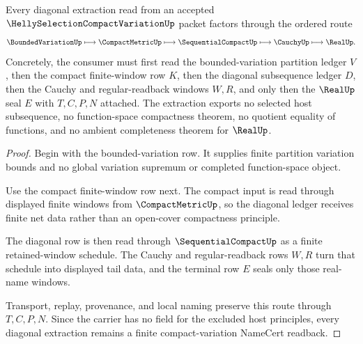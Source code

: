 \begin{theorem}
\label{thm:helly-selection-compact-variation-diagonal-extraction}
Every diagonal extraction read from an accepted $\HellySelectionCompactVariationUp$ packet factors through the ordered route
$$
\BoundedVariationUp \longmapsto \CompactMetricUp \longmapsto \SequentialCompactUp \longmapsto \CauchyUp \longmapsto \RealUp .
$$
Concretely, the consumer must first read the bounded-variation partition ledger $V$, then the compact finite-window row $K$, then the diagonal subsequence ledger $D$, then the Cauchy and regular-readback windows $W,R$, and only then the $\RealUp$ seal $E$ with $T,C,P,N$ attached. The extraction exports no selected host subsequence, no function-space compactness theorem, no quotient equality of functions, and no ambient completeness theorem for $\RealUp$.
\end{theorem}
\begin{proof}
Begin with the bounded-variation row. It supplies finite partition variation bounds and no global variation supremum or completed function-space object.

Use the compact finite-window row next. The compact input is read through displayed finite windows from $\CompactMetricUp$, so the diagonal ledger receives finite net data rather than an open-cover compactness principle.

The diagonal row is then read through $\SequentialCompactUp$ as a finite retained-window schedule. The Cauchy and regular-readback rows $W,R$ turn that schedule into displayed tail data, and the terminal row $E$ seals only those real-name windows.

Transport, replay, provenance, and local naming preserve this route through $T,C,P,N$. Since the carrier has no field for the excluded host principles, every diagonal extraction remains a finite compact-variation NameCert readback.
\end{proof}



